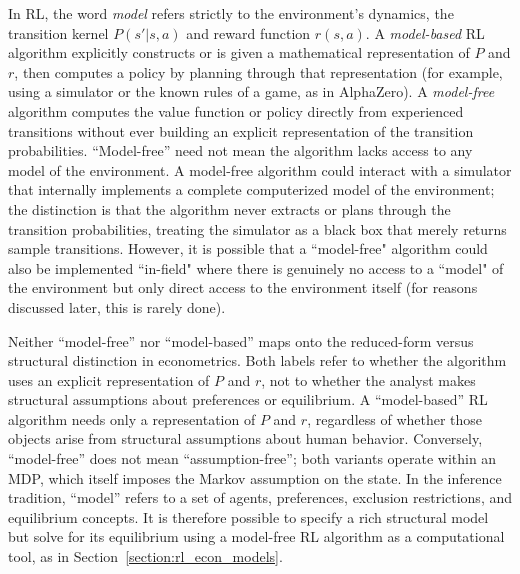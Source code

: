 In RL, the word \textit{model} refers strictly to the environment's dynamics, the transition kernel $P(s'|s,a)$ and reward function $r(s,a)$. A \textit{model-based} RL algorithm explicitly constructs or is given a mathematical representation of $P$ and $r$, then computes a policy by planning through that representation (for example, using a simulator or the known rules of a game, as in AlphaZero). A \textit{model-free} algorithm computes the value function or policy directly from experienced transitions without ever building an explicit representation of the transition probabilities. ``Model-free'' need not mean the algorithm lacks access to any model of the environment. A model-free algorithm could interact with a simulator that internally implements a complete computerized model of the environment; the distinction is that the algorithm never extracts or plans through the transition probabilities, treating the simulator as a black box that merely returns sample transitions. However, it is possible that a ``model-free" algorithm could also be implemented ``in-field" where there is genuinely no access to a ``model" of the environment but only direct access to the environment itself (for reasons discussed later, this is rarely done). 

Neither ``model-free'' nor ``model-based'' maps onto the reduced-form versus structural distinction in econometrics. Both labels refer to whether the algorithm uses an explicit representation of $P$ and $r$, not to whether the analyst makes structural assumptions about preferences or equilibrium. A ``model-based'' RL algorithm needs only a representation of $P$ and $r$, regardless of whether those objects arise from structural assumptions about human behavior. Conversely, ``model-free'' does not mean ``assumption-free''; both variants operate within an MDP, which itself imposes the Markov assumption on the state. In the inference tradition, ``model'' refers to a set of agents, preferences, exclusion restrictions, and equilibrium concepts. It is therefore possible to specify a rich structural model but solve for its equilibrium using a model-free RL algorithm as a computational tool, as in Section~\ref{section:rl_econ_models}. 

